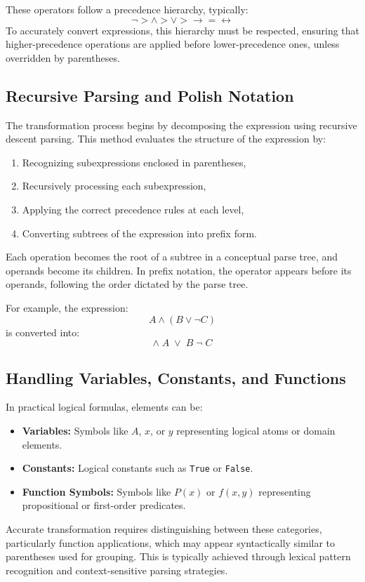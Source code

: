 \documentclass[11pt]{article}
\begin{document}
These operators follow a precedence hierarchy, typically:
\[
\neg > \land > \lor > \rightarrow = \leftrightarrow
\]
To accurately convert expressions, this hierarchy must be respected, ensuring that higher-precedence operations are applied before lower-precedence ones, unless overridden by parentheses.

\subsection{Recursive Parsing and Polish Notation}
The transformation process begins by decomposing the expression using recursive descent parsing. This method evaluates the structure of the expression by:
\begin{enumerate}
    \item Recognizing subexpressions enclosed in parentheses,
    \item Recursively processing each subexpression,
    \item Applying the correct precedence rules at each level,
    \item Converting subtrees of the expression into prefix form.
\end{enumerate}

Each operation becomes the root of a subtree in a conceptual parse tree, and operands become its children. In prefix notation, the operator appears before its operands, following the order dictated by the parse tree.

For example, the expression:
\[
A \land (B \lor \neg C)
\]
is converted into:
\[
\land \; A \; \lor \; B \; \neg \; C
\]

\subsection{Handling Variables, Constants, and Functions}
In practical logical formulas, elements can be:
\begin{itemize}
    \item \textbf{Variables:} Symbols like $A$, $x$, or $y$ representing logical atoms or domain elements.
    \item \textbf{Constants:} Logical constants such as \texttt{True} or \texttt{False}.
    \item \textbf{Function Symbols:} Symbols like $P(x)$ or $f(x, y)$ representing propositional or first-order predicates.
\end{itemize}

Accurate transformation requires distinguishing between these categories, particularly function applications, which may appear syntactically similar to parentheses used for grouping. This is typically achieved through lexical pattern recognition and context-sensitive parsing strategies.
\end{document}
